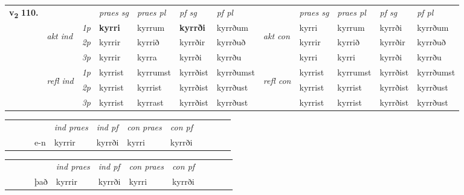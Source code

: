 \begin{tabular}{llllllllllll} \toprule
\multirow{4}{*}{{{\textbf{v{\textsubscript{2}}} \Large{\textbf{110.}}}}}  & &   &  \textit{praes sg}  & \textit{praes pl}  &\textit{ pf sg} & \textit{pf pl} &  &  \textit{praes sg}  & \textit{praes pl}  & \textit{pf sg} & \textit{pf pl } \\*
	\cmidrule{4-7} \cmidrule{9-12}
 & \multirow{3}{*}{\begin{turn}{90}\textit{akt ind}\end{turn}} & {\textit{1p}} & \textbf{kyrri} & kyrrum    & \textbf{kyrrði} & kyrrðum & \multirow{3}{*}{\begin{turn}{90}\textit{akt con}\end{turn}} &kyrri & kyrrum & kyrrði & kyrrðum\\*
& &  {\textit{2p}} &  kyrrir  & kyrrið   & kyrrðir & kyrrðuð & & kyrrir & kyrrið & kyrrðir & kyrrðuð \\*
& &  {\textit{3p}} & kyrrir & kyrra   & kyrrði & kyrrðu & & kyrri & kyrri& kyrrði & kyrrðu  \\*
\cmidrule{4-7} \cmidrule{9-12}
 &\multirow{3}{*}{\begin{turn}{90}\textit{refl ind}\end{turn}} & {\textit{1p}} & kyrrist & kyrrumst    & kyrrðist & kyrrðumst & \multirow{3}{*}{\begin{turn}{90}\textit{refl con}\end{turn}}  &kyrrist & kyrrumst & kyrrðist & kyrrðumst\\*
 &&  {\textit{2p}} &  kyrrist  & kyrrist   & kyrrðist & kyrrðust & &kyrrist & kyrrist & kyrrðist & kyrrðust \\*
& &  {\textit{3p}} & kyrrist & kyrrast   & kyrrðist & kyrrðust & & kyrrist & kyrrist& kyrrðist & kyrrðust  \\*
\cmidrule{4-7} \cmidrule{9-12}
\end{tabular}


\begin{tabular}{llllllllllll}
 & &  & &  \textit{ind praes} & \textit{ind pf} & \textit{con praes} & \textit{con pf} \\*
&  & & e-n & kyrrir & kyrrði & kyrri & kyrrði \\*
\cmidrule{5-9}
\end{tabular}


\begin{tabular}{llllllllllll}
 & &  & &  \textit{ind praes} & \textit{ind pf} & \textit{con praes} & \textit{con pf} \\*
&  & & það & kyrrir & kyrrði & kyrri & kyrrði \\*
\cmidrule{5-9}
\end{tabular}


